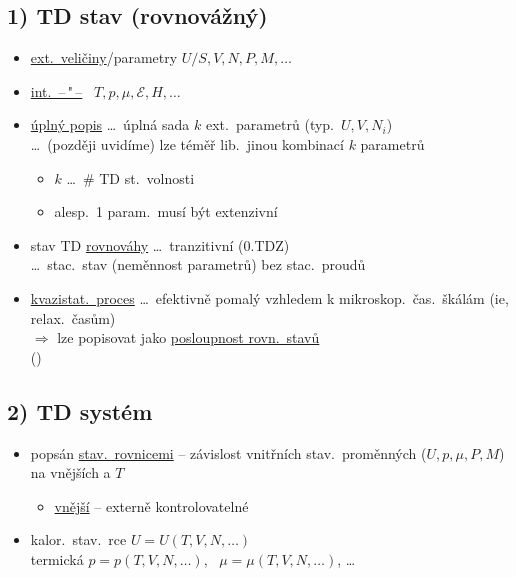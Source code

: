 \subsection*{1) TD stav (rovnovážný)}
\begin{itemize}
  \item \underline{ext.\ veličiny}/parametry \qquad $U/S, V, N, P, M, \dots$
  \item \underline{int.\ \quad --\,{}"\,--} \qquad\qquad\quad\ $T, p, \mu, \mathcal{E}, H, \dots$
  \item \underline{úplný popis} \dots\ úplná sada $k$ ext.\ parametrů (typ.\ $U, V, N_i$) \\
  \hspace*{2.2cm} \dots\ (později uvidíme) lze téměř lib.\ jinou kombinací $k$ parametrů
  \begin{itemize}[nosep]
    \item[--] $k$ \dots\ \# TD st.\ volnosti
    \item[--] alesp.\ 1 param.\ musí být extenzivní
  \end{itemize}
  \item stav TD \underline{rovnováhy} \dots\ tranzitivní (0.TDZ) \\
  \quad \dots\ stac.\ stav (neměnnost parametrů) bez stac.\ proudů
  \item \underline{kvazistat.\ proces} \dots\ efektivně  pomalý vzhledem k mikroskop.\ čas.\ škálám (ie, relax.\ časům) \\
  \quad $\Rightarrow$ lze popisovat jako \underline{posloupnost rovn.\ stavů} \\
  \quad ()
\end{itemize}

\subsection*{2) TD systém}
\begin{itemize}
  \item popsán \underline{stav.\ rovnicemi} -- závislost vnitřních stav.\ proměnných ($U, p, \mu, P, M$) na vnějších a $T$
  \begin{itemize}[nosep]
    \item \underline{vnější} -- externě kontrolovatelné
  \end{itemize}
  \item kalor.\ stav.\ rce \quad $U = U(T, V, N, \dots)$ \\
        termická \hspace*{1.55cm} $p = p(T, V, N, \dots)$, \ $\mu = \mu(T, V, N, \dots)$, \dots
\end{itemize}

